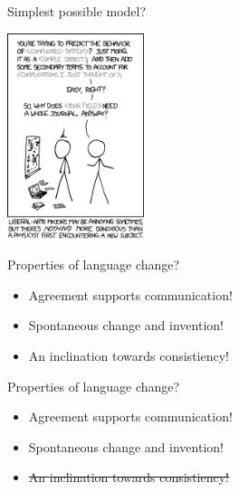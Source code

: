 \documentclass{beamer}
\begin{document}
\begin{frame}{Simplest possible model?}
  \begin{minipage}[t][.7\textheight]{\textwidth}
    \vskip 1cm
    \begin{center}
      \includegraphics[width=0.3\textwidth]{physicists.png}
    \end{center}
\end{minipage}
\vfill
\color{gray}
\color{black}
\end{frame}

\begin{frame}{Properties of language change?}
  \begin{minipage}[t][.7\textheight]{\textwidth}
    \vskip 1cm
    \begin{itemize}
    \item Agreement supports communication!
    \item Spontaneous change and invention!
    \item An inclination towards consistiency!
      \end{itemize}
  \end{minipage}
\end{frame}


\begin{frame}{Properties of language change?}
  \begin{minipage}[t][.7\textheight]{\textwidth}
    \vskip 1cm
    \begin{itemize}
    \item Agreement supports communication!
    \item Spontaneous change and invention!
    \item \sout{An inclination towards consistiency!}
      \end{itemize}
  \end{minipage}
\end{frame}
\end{document}
